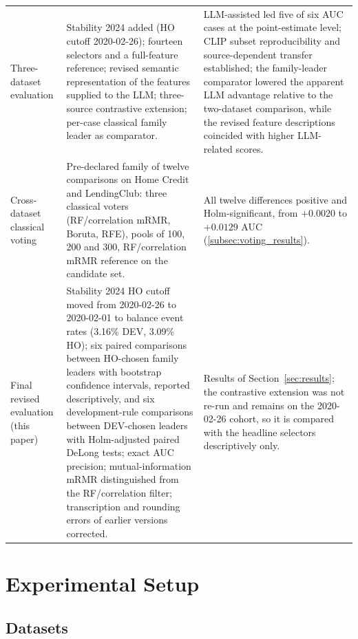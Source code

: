 \documentclass[final,5p,twocolumn]{elsarticle}
\begin{document}
\begin{table}[htbp]
\begin{threeparttable}
\begin{tabular}{@{}L{27mm}L{\dimexpr(\textwidth-27mm-4\tabcolsep)/2\relax}L{\dimexpr(\textwidth-27mm-4\tabcolsep)/2\relax}@{}}
\addlinespace
Three-dataset evaluation & Stability 2024 added (HO cutoff 2020-02-26); fourteen selectors and a full-feature reference; revised semantic representation of the features supplied to the LLM; three-source contrastive extension; per-case classical family leader as comparator. & LLM-assisted led five of six AUC cases at the point-estimate level; CLIP subset reproducibility and source-dependent transfer established; the family-leader comparator lowered the apparent LLM advantage relative to the two-dataset comparison, while the revised feature descriptions coincided with higher LLM-related scores. \\
\addlinespace
Cross-dataset classical voting & Pre-declared family of twelve comparisons on Home Credit and LendingClub: three classical voters (RF/correlation mRMR, Boruta, RFE), pools of 100, 200 and 300, RF/correlation mRMR reference on the candidate set. & All twelve differences positive and Holm-significant, from $+0.0020$ to $+0.0129$ AUC (\ref{subsec:voting_results}). \\
\addlinespace
Final revised evaluation (this paper) & Stability 2024 HO cutoff moved from 2020-02-26 to 2020-02-01 to balance event rates (3.16\% DEV, 3.09\% HO); six paired comparisons between HO-chosen family leaders with bootstrap confidence intervals, reported descriptively, and six development-rule comparisons between DEV-chosen leaders with Holm-adjusted paired DeLong tests; exact AUC precision; mutual-information mRMR distinguished from the RF/correlation filter; transcription and rounding errors of earlier versions corrected. & Results of Section~\ref{sec:results}; the contrastive extension was not re-run and remains on the 2020-02-26 cohort, so it is compared with the headline selectors descriptively only. \\
\bottomrule
\end{tabular}
\end{threeparttable}
\end{table}


\section{Experimental Setup}
\label{sec:experimental_setup}

\subsection{Datasets}
\label{subsec:datasets}
\end{document}
